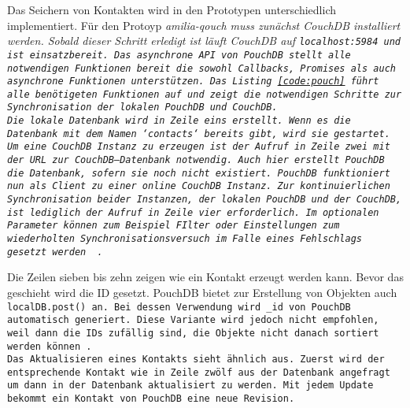 Das Seichern von Kontakten wird in den Prototypen unterschiedlich implementiert.
%
%
Für den Protoyp \it{amilia-qouch} muss zunächst CouchDB installiert werden.
Sobald dieser Schritt erledigt ist läuft CouchDB auf \tt{localhost:5984} und ist einsatzbereit.
Das asynchrone \gls{API} von PouchDB stellt alle notwendigen Funktionen bereit die sowohl Callbacks, Promises als auch asynchrone Funktionen unterstützen. 
Das Listing \ref{code:pouch} führt alle benötigeten Funktionen auf und zeigt die notwendigen Schritte zur Synchronisation der lokalen PouchDB und CouchDB.\\
Die lokale Datenbank wird in Zeile eins erstellt. Wenn es die Datenbank mit dem Namen `contacts` bereits gibt, wird sie gestartet.\\
Um eine CouchDB Instanz zu erzeugen ist der Aufruf in Zeile zwei mit der URL zur CouchDB--Datenbank notwendig. Auch hier erstellt PouchDB die Datenbank, sofern sie noch nicht existiert. PouchDB funktioniert nun als Client zu einer online CouchDB Instanz.
Zur kontinuierlichen Synchronisation beider Instanzen, der lokalen PouchDB und der CouchDB, ist lediglich der Aufruf in Zeile vier erforderlich. Im optionalen Parameter können zum Beispiel FIlter oder Einstellungen zum wiederholten Synchronisationsversuch im Falle eines Fehlschlags gesetzt werden ~\cite{pouch_options}.
%
\begin{center}
  
\end{center}
%
Die Zeilen sieben bis zehn zeigen wie ein Kontakt erzeugt werden kann. Bevor das geschieht wird die ID gesetzt. PouchDB bietet zur Erstellung von Objekten auch \tt{localDB.post()} an. Bei dessen Verwendung wird \tt{\_id} von PouchDB automatisch generiert. Diese Variante wird jedoch nicht empfohlen, weil dann die IDs zufällig sind, die Objekte nicht danach sortiert werden können~\cite{pouch-create}.\\
Das Aktualisieren eines Kontakts sieht ähnlich aus. Zuerst wird der entsprechende Kontakt wie in Zeile zwölf aus der Datenbank angefragt um dann in der Datenbank aktualisiert zu werden. Mit jedem Update bekommt ein Kontakt von PouchDB eine neue Revision.\\
